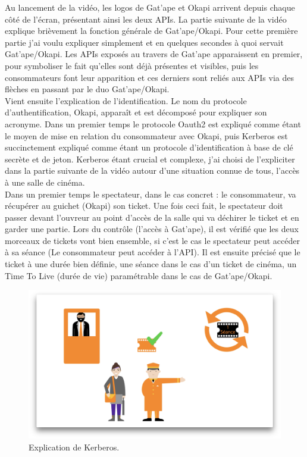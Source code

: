 Au lancement de la vidéo, les logos de Gat'ape et Okapi arrivent depuis chaque côté de l'écran, présentant ainsi les deux APIs. La partie suivante de la vidéo explique brièvement la fonction générale de Gat'ape/Okapi. Pour cette première partie j'ai voulu expliquer simplement et en quelques secondes à quoi servait Gat'ape/Okapi.  Les APIs exposés au travers de Gat'ape apparaissent en premier, pour symboliser le fait qu'elles sont déjà présentes et visibles, puis les consommateurs font leur apparition et ces derniers sont reliés aux APIs via des flèches en passant par le duo Gat'ape/Okapi.\\

Vient ensuite l'explication de l'identification. Le nom du protocole d'authentification, Okapi, apparaît et est décomposé pour expliquer son acronyme. Dans un premier temps le protocole Oauth2 est expliqué comme étant le moyen de mise en relation du consommateur avec Okapi,  puis Kerberos est succinctement expliqué comme étant un protocole d'identification à base de clé secrète et de jeton. Kerberos étant crucial et complexe, j'ai choisi de l'expliciter dans la partie suivante de la vidéo autour d'une situation connue de tous, l'accès à une salle de cinéma.\\

Dans un premier temps le spectateur, dans le cas concret : le consommateur, va récupérer au guichet (Okapi) son ticket. Une fois ceci fait, le spectateur doit passer devant l'ouvreur au point d'accès de la salle qui va déchirer le ticket et en garder une partie. Lors du contrôle (l'accès à Gat'ape), il est vérifié que les deux morceaux de tickets vont bien ensemble, si c'est le cas le spectateur peut accéder à sa séance (Le consommateur peut accéder à l'API). Il est ensuite précisé que le ticket à une durée bien définie, une séance dans le cas d'un ticket de cinéma, un Time To Live (durée de vie) paramétrable dans le cas de Gat'ape/Okapi.\\

\begin{figure}[htp]
  \centering
  \includegraphics[width=15cm]{images/gao/screenGao}
  \caption{Explication de Kerberos.}
  \label{screengatape}
\end{figure}

